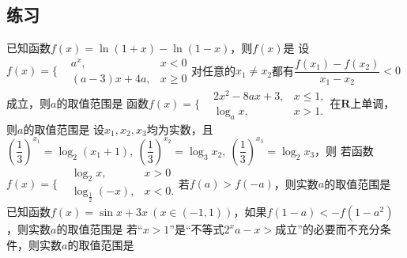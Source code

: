 \documentclass{BHCexam}
\begin{document}
\subsection*{练习}
\begin{questions}

\qs 已知函数$f(x)=\ln \left(1+x\right)-\ln \left(1-x\right)$，则$f(x)$是\xx
{}
\qs 设$f(x)=\Bigg\{\begin{aligned}
&a^x,&x<0\\
&(a-3)x+4a,&x\ge 0
\end{aligned}$对任意的$ x_1\ne x_2 $都有$ \dfrac{f(x_1)-f(x_2)}{x_1-x_2}<0 $成立，则$ a $的取值范围是\xx
\onech{$ \left(0,\dfrac{1}{4}\right]$}{$ \left(0,1\right)$}{$ \left[\dfrac{1}{4},1\right)$}{$ \left(0,3\right)$}
\qs 函数$f(x)=\Bigg\{\begin{aligned}
&2x^2-8ax+3,&x\le 1,\\
&\log_ax,&x>1.
\end{aligned}$在$\mathbf{R}$上单调，则$ a $的取值范围是\xx
\onech{$ \left(0,\dfrac{1}{2}\right]$}{$ \left[\dfrac{1}{2},1\right)$}{$ \left[\dfrac{1}{2},\dfrac{5}{8}\right]$}{$ \left[\dfrac{5}{8},1\right)$}
\qs 设$ x_1,x_2,x_3 $均为实数，且$ \left(\dfrac{1}{3}\right)^{x_1}=\log_2\left(x_1+1\right),~\left(\dfrac{1}{3}\right)^{x_2}=\log_3x_2, ~\left(\dfrac{1}{3}\right)^{x_3}=\log_2x_3$，则\xx
{}
\qs 若函数$f(x)=\Bigg\{\begin{aligned}
&\log_2x,&x>0\\
&\log_{\frac{1}{2}}(-x),&x<0.
\end{aligned}$若$ f(a)>f(-a) $，则实数$ a $的取值范围是\xx
{}
\qs 已知函数$f(x)=\sin x+3x~(x\in (-1,1))$，如果$ f(1-a)<-f(1-a^2) $，则实数$ a $的取值范围是\xx
{}
\qs 若“$ x>1 $”是“不等式$ 2^xa-x> $成立”的必要而不充分条件，则实数$ a $的取值范围是\xx
{}


\end{questions}
\end{document}
